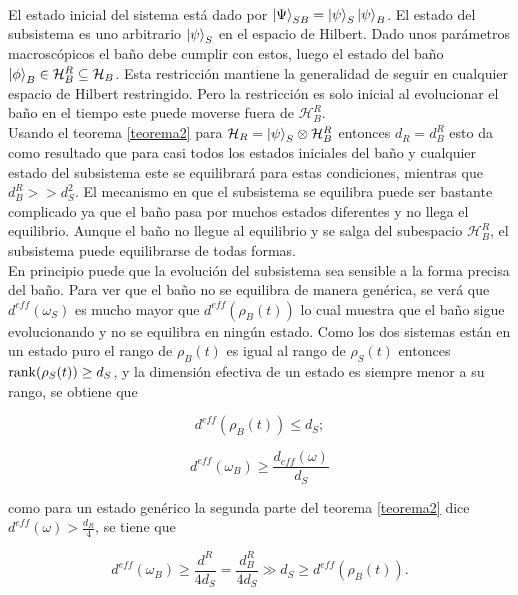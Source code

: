 \\
El estado inicial del sistema está dado por $\ket{\Psi}_{SB}=\ket{\psi}_{S} \ket{\psi}_{B}$. El estado del subsistema es uno arbitrario $\ket{\psi}_{S}$ en el espacio de Hilbert. Dado unos parámetros macroscópicos el baño  debe cumplir con estos, luego el estado del baño $\ket{\phi}_{B} \in \mathcal{H}_{B}^{R} \subseteq \mathcal{H}_{B}$. Esta restricción mantiene la generalidad de seguir en cualquier espacio de Hilbert restringido. Pero la restricción es solo inicial al evolucionar el baño en el tiempo este puede moverse fuera de $\mathcal{H}_{B}^{R}$.
\\
Usando el teorema \ref{teorema2} para $\mathcal{H}_{R}= \ket{\psi}_{S} \otimes \mathcal{H}_{B}^{R}$ entonces $d_{R}=d_{B}^{R}$ esto da como resultado que para casi todos los estados iniciales del baño y cualquier estado del subsistema este se equilibrará para estas condiciones, mientras que $d_{B}^{R} >> d_{S}^{2}$. El mecanismo en que el subsistema se equilibra puede ser bastante complicado ya que el baño pasa por muchos estados diferentes y no llega el equilibrio. Aunque el baño no llegue al equilibrio y se salga del subespacio $\mathcal{H}_{B}^{R}$, el subsistema  puede equilibrarse de todas formas. 
\\
En principio puede que la evolución del subsistema sea sensible a la forma precisa del baño. Para ver que el baño no se equilibra de manera genérica, se verá que $d^{eff}(\omega_{S})$ es mucho mayor que $d^{eff}(\rho_{B}(t))$ lo cual muestra que el baño sigue evolucionando y no se equilibra en ningún estado. Como los dos sistemas están en un estado puro el rango de $\rho_{B}(t)$ es igual al rango de $\rho_{S}(t)$ entonces  $\rank(\rho_{S}(t)) \geq d_{S}$, y la dimensión efectiva de un estado es siempre menor a su rango, se obtiene que

\begin{equation}
d^{eff}(\rho_{B}(t)) \leq d_{S};
\end{equation}

\begin{equation}
d^{eff}(\omega_{B}) \geq \frac{d_{eff}(\omega)}{d_{S}}
\end{equation}

como para un estado genérico la segunda parte del teorema \ref{teorema2}  dice $d^{eff}(\omega) > \frac{d_{R}}{4}$, se tiene que

\begin{equation}
d^{eff}(\omega_{B}) \geq \frac{d^{R}}{4d_{S}}=\frac{d_{B}^{R}}{4d_{S}} \gg d_{S} \geq d^{eff}(\rho_{B}(t)).
\end{equation}



